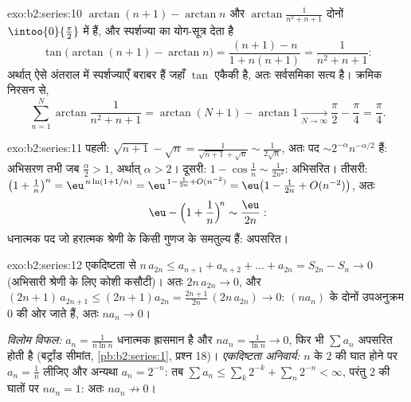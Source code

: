 \begin{solution}{exo:b2:series:10}
$\arctan(n+1) - \arctan n$ और $\arctan\frac{1}{n^2+n+1}$ दोनों $\intoo{0}{\frac\pi2}$ में हैं, और स्पर्शज्या का योग-सूत्र देता है
\[
\tan\bigl(\arctan(n{+}1) - \arctan n\bigr)
= \frac{(n+1) - n}{1 + n(n+1)} = \frac{1}{n^2 + n + 1} :
\]
अर्थात् ऐसे अंतराल में स्पर्शज्याएँ बराबर हैं जहाँ $\tan$ एकैकी है, अतः
सर्वसमिका सत्य है। क्रमिक निरसन से,
\[
\sum_{n=1}^{N}\arctan\frac{1}{n^2+n+1}
= \arctan(N{+}1) - \arctan 1 \xrightarrow[N\to\infty]{}
\frac\pi2 - \frac\pi4 = \frac\pi4 .
\]

\end{solution}

\begin{solution}{exo:b2:series:11}
पहली: $\sqrt{n+1} - \sqrt n = \frac{1}{\sqrt{n+1} + \sqrt n}
\sim \frac{1}{2\sqrt n}$, अतः पद $\sim
2^{-\alpha}n^{-\alpha/2}$ हैं: अभिसरण तभी जब $\frac\alpha2 > 1$, अर्थात् $\alpha > 2$। दूसरी: $1 - \cos\frac1n \sim
\frac{1}{2n^2}$:
अभिसरित। तीसरी: $\bigl(1 + \frac1n\bigr)^n =
\eu^{\,n\ln(1 + 1/n)} = \eu^{\,1 - \frac1{2n} + O(n^{-2})} =
\eu\bigl(1 - \frac{1}{2n} + O(n^{-2})\bigr)$, अतः
\[
\eu - \Bigl(1 + \frac1n\Bigr)^{\!n} \sim \frac{\eu}{2n} :
\]
धनात्मक पद जो हरात्मक श्रेणी के किसी गुणज के समतुल्य हैं: अपसरित।
\end{solution}

\begin{solution}{exo:b2:series:12}
एकदिष्टता से $n\,a_{2n} \leq a_{n+1} + a_{n+2} + \dots +
a_{2n} = S_{2n} - S_n \to 0$ (अभिसारी श्रेणी के लिए कोशी कसौटी)। अतः $2n\,a_{2n} \to 0$, और $(2n{+}1)\,
a_{2n+1} \leq (2n{+}1)a_{2n} = \frac{2n+1}{2n}\,(2n\,a_{2n}) \to
0$:
$(na_n)$ के दोनों उपअनुक्रम $0$ की ओर जाते हैं, अतः $na_n \to 0$।

\emph{विलोम विफल:} $a_n = \frac1{n\ln n}$ धनात्मक ह्रासमान है और $na_n = \frac1{\ln n} \to 0$, फिर भी $\sum a_n$ अपसरित
होती है (बर्ट्रांड सीमांत, \cref{pb:b2:series:1}, प्रश्न 18)। \emph{एकदिष्टता अनिवार्य:}
$n$ के $2$ की घात होने पर $a_n = \frac1n$ लीजिए और अन्यथा $a_n = 2^{-n}$: तब $\sum a_n \leq
\sum_k 2^{-k} + \sum_n 2^{-n} < \infty$, परंतु $2$
की घातों पर $na_n = 1$: अतः $na_n \not\to 0$।
\end{solution}

